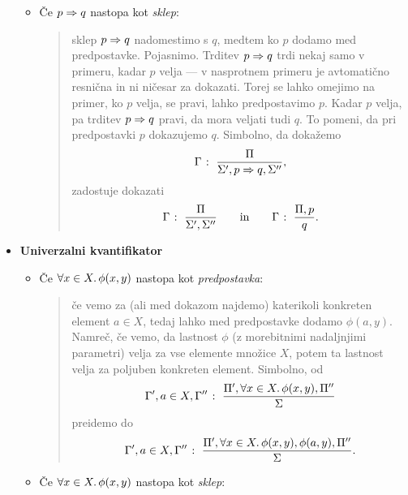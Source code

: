 \begin{itemize}
\begin{itemize}
                                \item
                                        Če $p \Rightarrow q$ nastopa kot \emph{sklep}:
                                        \begin{quote}
                                                sklep $p \Rightarrow q$ nadomestimo s $q$, medtem ko $p$ dodamo med predpostavke. Pojasnimo. Trditev $p \Rightarrow q$ trdi nekaj samo v primeru, kadar $p$ velja --- v nasprotnem primeru je avtomatično resnična in ni ničesar za dokazati. Torej se lahko omejimo na primer, ko $p$ velja, se pravi, lahko predpostavimo $p$. Kadar $p$ velja, pa trditev $p \Rightarrow q$ pravi, da mora veljati tudi $q$. To pomeni, da pri predpostavki $p$ dokazujemo $q$. Simbolno, da dokažemo
                                                \[{\Gamma} \;\colon\; \frac{\Pi}{\Sigma', p \Rightarrow q, \Sigma''},\]
                                                zadostuje dokazati
                                                \[{\Gamma} \;\colon\; \frac{\Pi}{\Sigma', \Sigma''} \qquad \text{in} \qquad {\Gamma} \;\colon\; \frac{\Pi, p}{q}.\]
                                        \end{quote}
                        \end{itemize}
                \item\textbf{Univerzalni kvantifikator}
                        \begin{itemize}
                                \item
                                        Če $\forall x \in X .\, \phi(x, y)$ nastopa kot \emph{predpostavka}:
                                        \begin{quote}
                                                če vemo za (ali med dokazom najdemo) katerikoli konkreten element $a \in X$, tedaj lahko med predpostavke dodamo $\phi(a, y)$. Namreč, če vemo, da lastnost $\phi$ (z morebitnimi nadaljnjimi parametri) velja za vse elemente množice $X$, potem ta lastnost velja za poljuben konkreten element. Simbolno, od
                                                \[{\Gamma', a \in X, \Gamma''} \;\colon\; \frac{\Pi', \forall x \in X .\, \phi(x, y), \Pi''}{\Sigma}\]
                                                preidemo do
                                                \[{\Gamma', a \in X, \Gamma''} \;\colon\; \frac{\Pi', \forall x \in X .\, \phi(x, y), \phi(a, y), \Pi''}{\Sigma}.\]
                                        \end{quote}
                                \item
                                        Če $\forall x \in X .\, \phi(x, y)$ nastopa kot \emph{sklep}:

\end{itemize}
\end{itemize}
